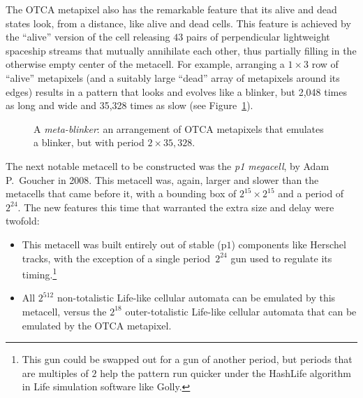 
The OTCA metapixel also has the remarkable feature that its alive and dead states look, from a distance, like alive and dead cells. This feature is achieved by the ``alive'' version of the cell releasing $43$ pairs of perpendicular lightweight spaceship streams that mutually annihilate each other, thus partially filling in the otherwise empty center of the metacell. For example, arranging a $1 \times 3$ row of ``alive'' metapixels (and a suitably large ``dead'' array of metapixels around its edges) results in a pattern that looks and evolves like a blinker, but 2,048 times as long and wide and 35,328 times as slow (see Figure~\ref{fig:metablinker}).

\begin{figure}[!htb]
	\centering
	\caption{A \emph{meta-blinker}: an arrangement of OTCA metapixels that emulates a blinker, but with period $2 \times 35,328$.}\label{fig:metablinker}
\end{figure}

The next notable metacell to be constructed was the \emph{p1 megacell}, by Adam P.~Goucher in 2008. This metacell was, again, larger and slower than the metacells that came before it, with a bounding box of $2^{15} \times 2^{15}$ and a period of $2^{24}$. The new features this time that warranted the extra size and delay were twofold:\smallskip

\begin{itemize}
	\item This metacell was built entirely out of stable (p$1$) components like Herschel tracks, with the exception of a single period~$2^{24}$ gun used to regulate its timing.\footnote{This gun could be swapped out for a gun of another period, but periods that are multiples of $2$ help the pattern run quicker under the HashLife algorithm in Life simulation software like Golly.}\smallskip
	
	\item All $2^{512}$ non-totalistic Life-like cellular automata can be emulated by this metacell, versus the $2^{18}$ outer-totalistic Life-like cellular automata that can be emulated by the OTCA metapixel.\smallskip
\end{itemize}

